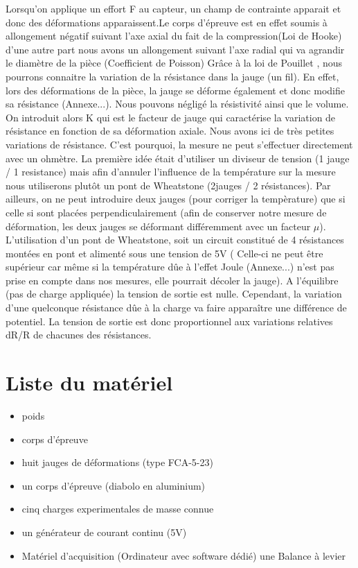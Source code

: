 \documentclass[11pt,a4paper]{report}
\begin{document}
Lorsqu'on applique un effort F au capteur, un champ de contrainte apparait et donc des déformations apparaissent.Le corps d'épreuve est en effet soumis à allongement négatif suivant l'axe axial du fait de la compression(Loi de Hooke) d'une autre part nous avons un allongement suivant l'axe radial qui va agrandir le diamètre de la pièce (Coefficient de Poisson) Grâce à la loi de Pouillet , nous pourrons connaitre la variation de la résistance dans la jauge (un fil). En effet, lors des déformations de la pièce, la jauge se déforme également et donc modifie sa résistance (Annexe...). Nous pouvons négligé la résistivité ainsi que le volume. On introduit alors K qui est le facteur de jauge qui caractérise la variation de résistance en fonction de sa déformation axiale. Nous avons ici de très petites variations de résistance.
C'est pourquoi, la mesure ne peut s'effectuer directement avec un ohmètre. La première idée était d'utiliser un diviseur de tension (1 jauge / 1 resistance) mais afin d'annuler l'influence de la température sur la mesure nous utiliserons plutôt un pont de Wheatstone (2jauges / 2 résistances). Par ailleurs, on ne peut introduire deux jauges (pour corriger la tempèrature) que si celle si sont placées perpendiculairement (afin de conserver notre mesure de déformation, les deux jauges se déformant différemment avec un facteur $\mu$). L'utilisation d'un pont de Wheatstone, soit un circuit constitué de 4 résistances montées en pont et alimenté sous une tension de 5V ( Celle-ci ne peut être supérieur car même si la température dûe à l'effet Joule (Annexe...) n'est pas prise en compte dans nos mesures, elle pourrait décoler la jauge). A l'équilibre (pas de charge appliquée) la tension de sortie est nulle. Cependant, la variation d'une quelconque résistance dûe à la charge va faire apparaître une différence de potentiel. La tension de sortie est donc proportionnel aux variations relatives dR/R de chacunes des résistances. 

\section*{Liste du matériel}
\begin{itemize}
\item poids 
\item corps d'épreuve
\item huit jauges de déformations (type FCA-5-23)
\item un corps d'épreuve (diabolo en aluminium)
\item cinq charges experimentales de masse connue
\item un générateur de courant continu (5V)
\item Matériel d'acquisition (Ordinateur avec software dédié)   une Balance à levier
\end{itemize}	
\end{document}
